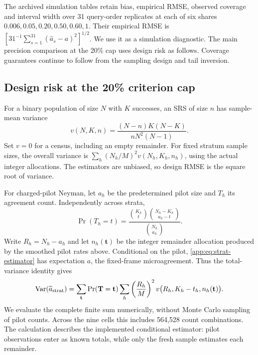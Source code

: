 The archived simulation tables retain bias, empirical RMSE, observed coverage
and interval width over 31 query-order replicates at each of six shares
$0.006,0.05,0.20,0.50,0.60,1$. Their empirical RMSE is
$[31^{-1}\sum_{s=1}^{31}(\widehat a_s-a)^2]^{1/2}$.
We use it as a simulation diagnostic. The main precision comparison at the
20\% cap uses design risk as follows. Coverage guarantees continue to follow
from the sampling design and tail inversion.

\subsection{Design risk at the 20\% criterion cap}\label{app:design-risk}
For a binary population of size $N$ with $K$ successes, an SRS of size $n$
has sample-mean variance
\begin{equation}
 v(N,K,n)=\frac{(N-n)K(N-K)}{nN^2(N-1)}.
\end{equation}
Set $v=0$ for a census, including an empty remainder. For fixed stratum
sample sizes, the overall variance is
$\sum_h(N_h/M)^2v(N_h,K_h,n_h)$, using the actual integer allocations.
The estimators are unbiased, so design RMSE is the square root of variance.

For charged-pilot Neyman, let $a_h$ be the predetermined pilot size and
$T_h$ its agreement count. Independently across strata,
\[
 \Pr(T_h=t)=\frac{\binom{K_h}{t}\binom{N_h-K_h}{a_h-t}}
 {\binom{N_h}{a_h}}.
\]
Write $R_h=N_h-a_h$ and let $n_h(\mathbf t)$ be the integer remainder
allocation produced by the smoothed pilot rates above. Conditional on the
pilot, \eqref{app:eq:strat-estimator} has expectation $a$, the fixed-frame
microagreement. Thus the total-variance identity gives
\begin{equation}
 \operatorname{Var}(\widehat a_{\rm strat})=
 \sum_{\mathbf t}\Pr(\mathbf T=\mathbf t)
 \sum_h\left(\frac{R_h}{M}\right)^2
 v\bigl(R_h,K_h-t_h,n_h(\mathbf t)\bigr).
\end{equation}
We evaluate the complete finite sum numerically, without Monte Carlo
sampling of pilot counts. Across the nine cells this includes 564,528
count combinations. The calculation describes the implemented conditional
estimator: pilot observations enter as known totals, while only the fresh
sample estimates each remainder.

